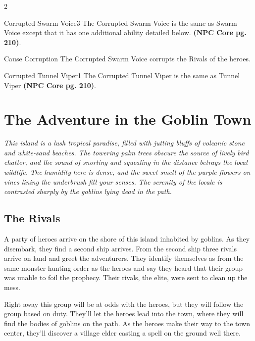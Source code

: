 \begin{multicols}{2}
  \begin{creaturebox}{Corrupted Swarm Voice}{3}
    The Corrupted Swarm Voice is the same as Swarm Voice except that it has one additional ability detailed below. \textbf{(NPC Core pg. 210)}.
  \end{creaturebox}
  \begin{pf-activity3}{Cause Corruption}
    The Corrupted Swarm Voice corrupts the Rivals of the heroes.
  \end{pf-activity3}

  \begin{creaturebox}{Corrupted Tunnel Viper}{1}
    The Corrupted Tunnel Viper is the same as Tunnel Viper \textbf{(NPC Core pg. 210)}.
  \end{creaturebox}


  \section{The Adventure in the Goblin Town}

  \begin{pf-parchment}[\textcolor{title1}{Description}]
    \textcolor{title1}{\textit{This island is a lush tropical paradise, filled with jutting bluffs of volcanic stone and white-sand beaches. The towering palm trees obscure the source of lively bird chatter, and the sound of snorting and squealing in the distance betrays the local wildlife. The humidity here is dense, and the sweet smell of the purple flowers on vines lining the underbrush fill your senses. The serenity of the locale is contrasted sharply by the goblins lying dead in the path.}}
  \end{pf-parchment}

  \subsection{The Rivals}

  A party of heroes arrive on the shore of this island inhabited by goblins. As they disembark, they find a second ship arrives. From the second ship three rivals arrive on land and greet the adventurers. They identify themselves as from the same monster hunting order as the heroes and say they heard that their group was unable to foil the prophecy. Their rivals, the elite, were sent to clean up the mess.

  Right away this group will be at odds with the heroes, but they will follow the group based on duty. They'll let the heroes lead into the town, where they will find the bodies of goblins on the path. As the heroes make their way to the town center, they'll discover a village elder casting a spell on the ground well there.


\end{multicols}
